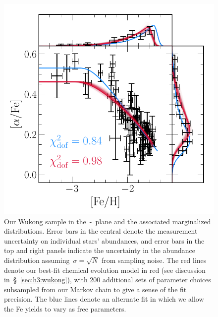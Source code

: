 \documentclass[ms.tex]{subfiles}
\begin{document}
\begin{figure}
\centering
\includegraphics[scale = 0.6]{wukong_bestfit.pdf}
\caption{
Our Wukong sample in the~\afe-\feh~plane and the associated marginalized
distributions.
Error bars in the central denote the measurement uncertainty on individual
stars' abundances, and error bars in the top and right panels indicate the
uncertainty in the abundance distribution assuming~$\sigma = \sqrt{N}$ from
sampling noise.
The red lines denote our best-fit chemical evolution model in red (see
discussion in~\S~\ref{sec:h3:wukong}), with 200 additional sets of parameter
choices subsampled from our Markov chain to give a sense of the fit precision.
The blue lines denote an alternate fit in which we allow the Fe yields to vary
as free parameters.
}
\label{fig:wukong}
\end{figure}
\end{document}
